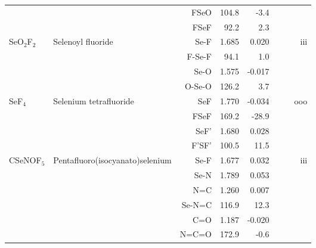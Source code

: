 \begin{table}
\begin{center}
\begin{tabular}{llrrrrrr}
             &                                    &FSeO         &     104.8   &      -3.4 &  &    &       \\
             &                                    &FSeF         &      92.2   &       2.3 &  &    &       \\
 SeO$_2$F$_2$      & Selenoyl fluoride                  &Se-F           &     1.685   &     0.020 &  &  &   iii \\
             &                                    &F-Se-F       &      94.1   &       1.0 &  &    &       \\
             &                                    &Se-O           &     1.575   &    -0.017 &  &  &       \\
             &                                    &O-Se-O       &     126.2   &       3.7 &  &    &       \\
 SeF$_4$        & Selenium tetrafluoride             &SeF            &     1.770   &    -0.034 &  &  &   ooo \\
             &                                    &FSeF         &     169.2   &     -28.9 &  &    &       \\
             &                                    &SeF'           &     1.680   &     0.028 &  &  &       \\
             &                                    &F'SF'        &     100.5   &      11.5 &  &    &       \\
 CSeNOF$_5$     & Pentafluoro(isocyanato)selenium    &Se-F           &     1.677   &     0.032 &  &  &   iii \\
             &                                    &Se-N           &     1.789   &     0.053 &  &  &       \\
             &                                    &N=C            &     1.260   &     0.007 &  &  &       \\
             &                                    &Se-N=C       &     116.9   &      12.3 &  &    &       \\
             &                                    &C=O            &     1.187   &    -0.020 &  &  &       \\
             &                                    &N=C=O        &     172.9   &      -0.6 &  &    &       \\
\hline
\end{tabular}
\end{center}
\end{table}
\clearpage

